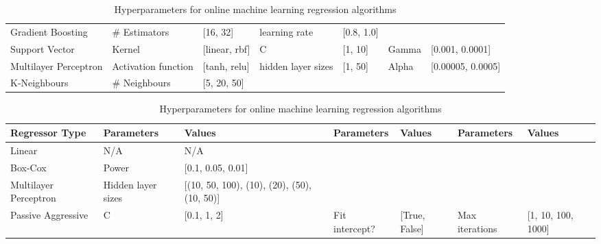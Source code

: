 \documentclass[final,3p,times,twocolumn,numbers]{elsarticle}
\begin{document}
\begin{table}
\begin{tabular}{@{}lllllll@{}}
Gradient Boosting       & \# Estimators       & {[}16, 32{]}      & learning rate       & {[}0.8, 1.0{]}  &                     &                       \\
Support Vector          & Kernel              & {[}linear, rbf{]} & C                   & {[}1, 10{]}     & Gamma               & {[}0.001, 0.0001{]}   \\
Multilayer Perceptron   & Activation function & {[}tanh, relu{]}  & hidden layer sizes  & {[}1, 50{]}     & Alpha               & {[}0.00005, 0.0005{]} \\
K-Neighbours            & \# Neighbours       & {[}5, 20, 50{]}   &                     &                 &                     &                       \\ \bottomrule
\end{tabular}%
\caption{Hyperparameters for offline machine learning regression algorithms}
\label{table:hyperparameter-tuning-offline}


\qquad
\qquad
\qquad

\centering
\begin{tabular}{@{}llp{2.5cm}lllp{1.6cm}@{}}
\toprule
\textbf{Regressor Type} & \textbf{Parameters} & \textbf{Values}                                  & \textbf{Parameters} & \textbf{Values}   & \textbf{Parameters} & \textbf{Values}        \\ \midrule
Linear                  & N/A                 & N/A                                              &                     &                   &                     &                        \\
Box-Cox                 & Power               & {[}0.1, 0.05, 0.01{]}                            &                     &                   &                     &                        \\
Multilayer Perceptron   & Hidden layer sizes  & {[}(10, 50, 100), (10),  (20), (50), (10, 50){]} & 
                    &                   &                     &                        \\ 
                    Passive Aggressive      & C                   & {[}0.1, 1, 2{]}                                  & Fit intercept?      & {[}True, False{]} & Max iterations      & {[}1, 10, 100, 1000{]} \\
\bottomrule
\end{tabular}%
\caption{Hyperparameters for online machine learning regression algorithms}
\label{table:hyperparameter-tuning-online}
\end{table}%
\end{document}
